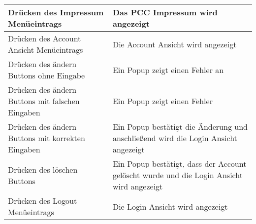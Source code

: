 \begin{longtable}{p{} | p{}}
\hline
Drücken des Impressum Menüeintrags & Das PCC Impressum wird angezeigt\\
\hline
Drücken des Account Ansicht Menüeintrags & Die Account Ansicht wird angezeigt\\
\hline
Drücken des ändern Buttons ohne Eingabe & Ein Popup zeigt einen Fehler an\\
\hline
Drücken des ändern Buttons mit falschen Eingaben & Ein Popup zeigt einen Fehler\\
\hline
Drücken des ändern Buttons mit korrekten Eingaben & Ein Popup bestätigt die Änderung und anschließend wird die Login Ansicht angezeigt\\
\hline
Drücken des löschen Buttons & Ein Popup bestätigt, dass der Account gelöscht wurde und die Login Ansicht wird angezeigt\\
\hline
Drücken des Logout Menüeintrags & Die Login Ansicht wird angezeigt\\
\hline

 \end{longtable}

